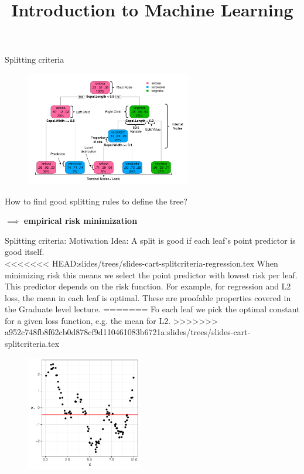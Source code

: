 \documentclass[11pt,compress,t,notes=noshow, xcolor=table]{beamer}
\title{Introduction to Machine Learning}
\institute{\href{https://compstat-lmu.github.io/lecture_i2ml/}{compstat-lmu.github.io/lecture\_i2ml}}
\date{}
\begin{document}
\sloppy


\begin{frame}{Splitting criteria}

 \begin{figure}
    \centering
      \includegraphics[height = 5.0cm, keepaspectratio]{figure/cart_intro_annotated-tree.pdf}
    \end{figure}

How to find good splitting rules to define the tree?
\lz

$\implies$ \textbf{empirical risk minimization}

\end{frame}

\begin{vbframe}{Splitting criteria: Motivation}
Idea: A split is good if each leaf's point predictor is good itself. \\

<<<<<<< HEAD:slides/trees/slides-cart-splitcriteria-regression.tex
When minimizing risk this means we select the point predictor with lowest risk per leaf.
This predictor depends on the risk function.
For example, for regression and L2 loss, the mean in each leaf is optimal.
These are proofable properties covered in the Graduate level lecture.
=======
Fo each leaf we pick the optimal constant for a given loss function, e.g. the mean for L2.
>>>>>>> a952c748fb8f62cb0d878cf9d110461083b6721a:slides/trees/slides-cart-splitcriteria.tex

\begin{figure}
\includegraphics[width=0.45\textwidth]{figure/splitcrit_optimal-constant.pdf} 
\end{figure}



\end{vbframe}
\end{document}
